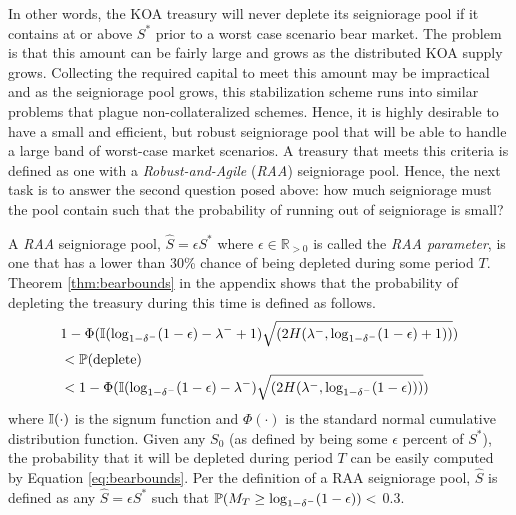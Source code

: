In other words, the KOA treasury will never deplete its seigniorage pool if it contains at or above $S^*$ prior to a worst case scenario bear market. The problem is that this amount can be fairly large and grows as the distributed KOA supply grows. Collecting the required capital to meet this amount may be impractical and as the seigniorage pool grows, this stabilization scheme runs into similar problems that plague non-collateralized schemes. Hence, it is highly desirable to have a small and efficient, but robust seigniorage pool that will be able to handle a large band of worst-case market scenarios. A treasury that meets this criteria is defined as one with a \textit{Robust-and-Agile} (\textit{RAA}) seigniorage pool. Hence, the next task is to answer the second question posed above: how much seigniorage must the pool contain such that the probability of running out of seigniorage is small?

A \textit{RAA} seigniorage pool, $\hat{S} = \epsilon S^*$ where $\epsilon \in \mathbb{R}_{>0}$ is called the \textit{RAA parameter}, is one that has a lower than 30\% chance of being depleted during some period $T$. Theorem \ref{thm:bearbounds} in the appendix shows that the probability of depleting the treasury during this time is defined as follows.
%
\begin{equation} \label{eq:bearbounds}
\begin{aligned}
& 1 - \Phi (\mathbb{I}(\log_{1- \delta^-}(1-\epsilon) - \lambda^- +1) \sqrt{(2H(\lambda^-, \log_{1- \delta^-}(1-\epsilon) +1))}) \\
& < \mathbb{P}(\text{deplete}) \\
& < 1 - \Phi (\mathbb{I}(\log_{1- \delta^-}(1-\epsilon) - \lambda^-) \sqrt{(2H(\lambda^-, \log_{1- \delta^-}(1-\epsilon)))})
\end{aligned}
\end{equation}
%
where $\mathbb{I}(\cdot)$ is the signum function and $\Phi(\cdot)$ is the standard normal cumulative distribution function. Given any $S_0$ (as defined by being some $\epsilon$ percent of $S^*$), the probability that it will be depleted during period $T$ can be easily computed by Equation \ref{eq:bearbounds}. Per the definition of a RAA seigniorage pool, $\hat{S}$ is defined as any $\hat{S} = \epsilon S^*$ such that $\mathbb{P}(M_T \geq  \log_{1- \delta^-}(1-\epsilon)) <$ 0.3.

